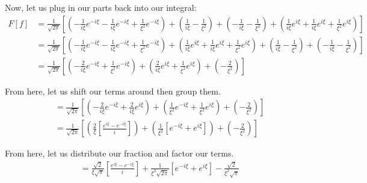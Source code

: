 \begin{enumerate}
Now, let us plug in our parts back into our integral:
%
\begin{align}
  F[f]
  & =
  \frac{1}{\sqrt{2 \pi}}
  \left[
    \left(
    - \frac{1}{ i \xi} e^{-i \xi}
    - \frac{1}{ i \xi} e^{-i \xi}
    + \frac{1}{ \xi^2} e^{-i \xi}
    \right)
    +
    \left(
      \frac{1}{ i \xi}
    - \frac{1}{ \xi^2}
    \right)
    +
    \left(
    - \frac{1}{ i \xi}
    - \frac{1}{ \xi^2}
    \right)
    +
    \left(
      \frac{1}{ i \xi} e^{i \xi}
    + \frac{1}{ i \xi} e^{i \xi}
    + \frac{1}{ \xi^2} e^{i \xi}
    \right)
  \right]\\
  & =
  \frac{1}{\sqrt{2 \pi}}
  \left[
    \left(
    - \frac{1}{ i \xi} e^{-i \xi}
    - \frac{1}{ i \xi} e^{-i \xi}
    + \frac{1}{ \xi^2} e^{-i \xi}
    \right)
    +
    \left(
      \frac{1}{ i \xi} e^{i \xi}
    + \frac{1}{ i \xi} e^{i \xi}
    + \frac{1}{ \xi^2} e^{i \xi}
    \right)
    +
    \left(
      \frac{1}{ i \xi}
    - \frac{1}{ \xi^2}
    \right)
    +
    \left(
    - \frac{1}{ i \xi}
    - \frac{1}{ \xi^2}
    \right)
  \right]\\
  & =
  \frac{1}{\sqrt{2 \pi}}
  \left[
    \left(
    - \frac{2}{ i \xi} e^{-i \xi}
    + \frac{1}{ \xi^2} e^{-i \xi}
    \right)
    +
    \left(
      \frac{2}{ i \xi} e^{i \xi}
    + \frac{1}{ \xi^2} e^{i \xi}
    \right)
    +
    \left(
    - \frac{2}{ \xi^2}
    \right)
  \right]
\end{align}

From here, let us shift our terms around then group them.
%
\begin{align}
  & =
  \frac{1}{\sqrt{2 \pi}}
  \left[
    \left(
    - \frac{2}{ i \xi} e^{-i \xi}
    + \frac{2}{ i \xi} e^{i \xi}
    \right)
    +
    \left(
      \frac{1}{ \xi^2} e^{-i \xi}
    + \frac{1}{ \xi^2} e^{i \xi}
    \right)
    +
    \left(
    - \frac{2}{ \xi^2}
    \right)
  \right]\\
  & =
  \frac{1}{\sqrt{2 \pi}}
  \left[
    \left(
    \frac{2}{\xi}
    \left[
    \frac{
       e^{i \xi}
    -  e^{-i \xi}
    }{i}
    \right]
    \right)
    +
    \left(
    \frac{1}{ \xi^2}
    \left[
      e^{-i \xi}
    + e^{i \xi}
    \right]
    \right)
    +
    \left(
    - \frac{2}{ \xi^2}
    \right)
  \right]
\end{align}

From here, let us distribute our fraction and factor our terms.
%
\begin{align}
  & =
  \frac{\sqrt 2}{\xi \sqrt\pi }
  \left[
    \frac{
    e^{i \xi}
    -  e^{-i \xi}
    }{i}
  \right]
  +
  \frac{1}{ \xi^2 \sqrt{2 \pi} }
  \left[
    e^{-i \xi}
    + e^{i \xi}
  \right]
    - \frac{\sqrt 2}{ \xi^2 \sqrt\pi }
\end{align}


\end{enumerate}
